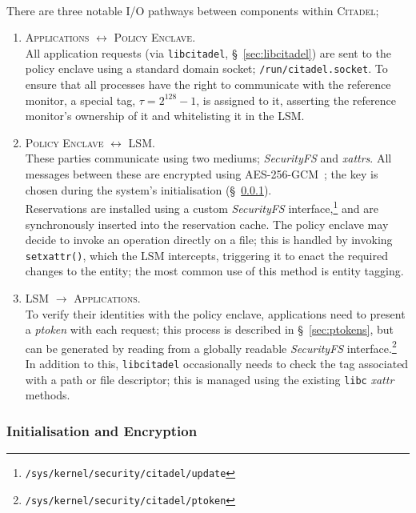 \paragraph{} There are three notable I/O pathways between components within \textsc{Citadel};
\begin{enumerate}
    \item \textsc{Applications $\longleftrightarrow$ Policy Enclave}. \\
    All application requests (via \texttt{libcitadel}, §~\ref{sec:libcitadel}) are sent to the policy enclave using a standard domain socket; \texttt{/run/citadel.socket}. To ensure that all processes have the right to communicate with the reference monitor, a special tag, $\tau = 2^{128} -1$, is assigned to it, asserting the reference monitor's ownership of it and whitelisting it in the LSM.
    \item \textsc{Policy Enclave $\longleftrightarrow$ LSM}. \\
    These parties communicate using two mediums; \textit{SecurityFS} and \textit{xattrs}. All messages between these are encrypted using AES-256-GCM~\cite{Rijndael,McGrew2005TheGM}; the key is chosen during the system's initialisation (§~\ref{sec:initialisation}). \\
    Reservations are installed using a custom \textit{SecurityFS} interface,\footnote{\texttt{/sys/kernel/security/citadel/update}} and are synchronously inserted into the reservation cache. The policy enclave may decide to invoke an operation directly on a file; this is handled by invoking \texttt{setxattr()}, which the LSM intercepts, triggering it to enact the required changes to the entity; the most common use of this method is entity tagging.
    \item \textsc{LSM $\longrightarrow$ Applications}. \\
    To verify their identities with the policy enclave, applications need to present a \textit{ptoken} with each request; this process is described in §~\ref{sec:ptokens}, but can be generated by reading from a globally readable \textit{SecurityFS} interface.\footnote{\texttt{/sys/kernel/security/citadel/ptoken}} \\
    In addition to this, \texttt{libcitadel} occasionally needs to check the tag associated with a path or file descriptor; this is managed using the existing \texttt{libc} \textit{xattr} methods.
\end{enumerate}

\subsubsection{Initialisation and Encryption}
\label{sec:initialisation}
